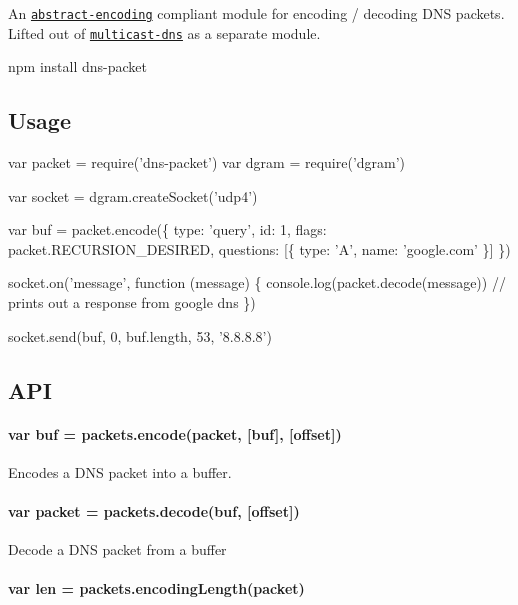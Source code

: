 An \href{https://github.com/mafintosh/abstract-encoding}{\tt abstract-\/encoding} compliant module for encoding / decoding D\+NS packets. Lifted out of \href{https://github.com/mafintosh/multicast-dns}{\tt multicast-\/dns} as a separate module.


\begin{DoxyCode}
npm install dns-packet
\end{DoxyCode}


\href{https://travis-ci.org/mafintosh/dns-packet}{\tt }

\subsection*{Usage}


\begin{DoxyCode}
var packet = require('dns-packet')
var dgram = require('dgram')

var socket = dgram.createSocket('udp4')

var buf = packet.encode(\{
  type: 'query',
  id: 1,
  flags: packet.RECURSION\_DESIRED,
  questions: [\{
    type: 'A',
    name: 'google.com'
  \}]
\})

socket.on('message', function (message) \{
  console.log(packet.decode(message)) // prints out a response from google dns
\})

socket.send(buf, 0, buf.length, 53, '8.8.8.8')
\end{DoxyCode}


\subsection*{A\+PI}

\paragraph*{{\ttfamily var buf = packets.\+encode(packet, \mbox{[}buf\mbox{]}, \mbox{[}offset\mbox{]})}}

Encodes a D\+NS packet into a buffer.

\paragraph*{{\ttfamily var packet = packets.\+decode(buf, \mbox{[}offset\mbox{]})}}

Decode a D\+NS packet from a buffer

\paragraph*{{\ttfamily var len = packets.\+encoding\+Length(packet)}}

